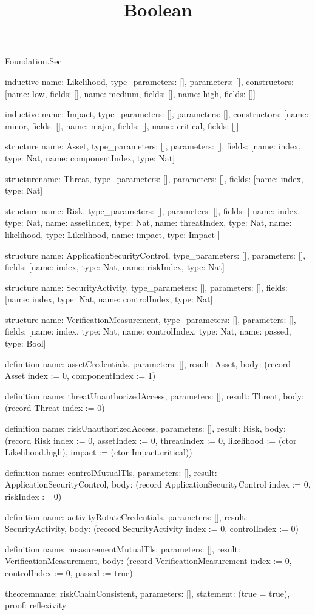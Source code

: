 \begin{lexlean}{Foundation.Sec}
\title{Boolean}
\begin{semanticmodule}
inductive{
  name: Likelihood,
  type_parameters: [],
  parameters: [],
  constructors: [{name: low, fields: []}, {name: medium, fields: []}, {name: high, fields: []}]
}

inductive{
  name: Impact,
  type_parameters: [],
  parameters: [],
  constructors: [{name: minor, fields: []}, {name: major, fields: []}, {name: critical, fields: []}]
}

structure{
  name: Asset,
  type_parameters: [],
  parameters: [],
  fields: [{name: index, type: Nat}, {name: componentIndex, type: Nat}]
}

structure{name: Threat, type_parameters: [], parameters: [], fields: [{name: index, type: Nat}]}

structure{
  name: Risk,
  type_parameters: [],
  parameters: [],
  fields: [
    {name: index, type: Nat},
    {name: assetIndex, type: Nat},
    {name: threatIndex, type: Nat},
    {name: likelihood, type: Likelihood},
    {name: impact, type: Impact}
  ]
}

structure{
  name: ApplicationSecurityControl,
  type_parameters: [],
  parameters: [],
  fields: [{name: index, type: Nat}, {name: riskIndex, type: Nat}]
}

structure{
  name: SecurityActivity,
  type_parameters: [],
  parameters: [],
  fields: [{name: index, type: Nat}, {name: controlIndex, type: Nat}]
}

structure{
  name: VerificationMeasurement,
  type_parameters: [],
  parameters: [],
  fields: [{name: index, type: Nat}, {name: controlIndex, type: Nat}, {name: passed, type: Bool}]
}

definition{
  name: assetCredentials,
  parameters: [],
  result: Asset,
  body: (record Asset {index := 0, componentIndex := 1})
}

definition{
  name: threatUnauthorizedAccess,
  parameters: [],
  result: Threat,
  body: (record Threat {index := 0})
}

definition{
  name: riskUnauthorizedAccess,
  parameters: [],
  result: Risk,
  body: (record Risk {index := 0, assetIndex := 0, threatIndex := 0, likelihood := (ctor Likelihood.high), impact := (ctor Impact.critical)})
}

definition{
  name: controlMutualTls,
  parameters: [],
  result: ApplicationSecurityControl,
  body: (record ApplicationSecurityControl {index := 0, riskIndex := 0})
}

definition{
  name: activityRotateCredentials,
  parameters: [],
  result: SecurityActivity,
  body: (record SecurityActivity {index := 0, controlIndex := 0})
}

definition{
  name: measurementMutualTls,
  parameters: [],
  result: VerificationMeasurement,
  body: (record VerificationMeasurement {index := 0, controlIndex := 0, passed := true})
}

theorem{name: riskChainConsistent, parameters: [], statement: (true = true), proof: reflexivity{}}
\end{semanticmodule}
\end{lexlean}
